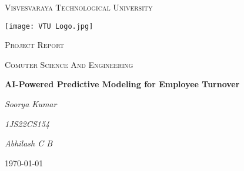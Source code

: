 \documentclass[12pt,a4paper]{article}
\begin{document}
	\begin{titlepage}        
    	\centering
   		 {\scshape\LARGE Visvesvaraya Technological University \par}
   		 \vspace{1cm}
   		 
   		 \texttt{[image: VTU Logo.jpg]}\par
   		 \vspace{1cm}
   		 
   		 {\scshape\LARGE Project Report\par}
   		 \vspace{1cm}
   		 
   		 {\scshape\large Comuter Science And Engineering \par}
   		 \vspace{1cm}
   		 
    	{\LARGE\bfseries AI-Powered Predictive Modeling for Employee Turnover\par}
    	\vspace{2cm}
    	
    	{\Large\itshape Soorya Kumar\par}
    	\vspace{1cm}
    	
    	{\Large\itshape 1JS22CS154 \par}
    	\vspace{1cm}
    	
    	{\Large\itshape Abhilash C B  \par}
    	
    	\vfill
    	
    	{\large \today\par}
    	
	\end{titlepage}
\end{document}
